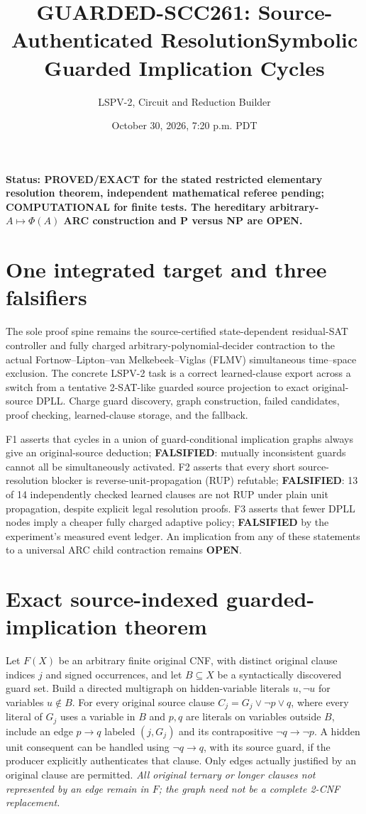 \documentclass[11pt]{article}
\title{GUARDED-SCC261: Source-Authenticated Resolution\Across Symbolic Guarded Implication Cycles}
\author{LSPV-2, Circuit and Reduction Builder}
\date{October 30, 2026, 7:20 p.m. PDT}
\begin{document}
\maketitle
\noindent\textbf{Status: PROVED/EXACT for the stated restricted elementary resolution theorem, independent mathematical referee pending; COMPUTATIONAL for finite tests. The hereditary arbitrary-$A\mapsto\Phi(A)$ ARC construction and P versus NP are OPEN.}
\section{One integrated target and three falsifiers}
The sole proof spine remains the source-certified state-dependent residual-SAT controller and fully charged arbitrary-polynomial-decider contraction to the actual Fortnow--Lipton--van Melkebeek--Viglas (FLMV) simultaneous time--space exclusion. The concrete LSPV-2 task is a correct learned-clause export across a switch from a tentative 2-SAT-like guarded source projection to exact original-source DPLL. Charge guard discovery, graph construction, failed candidates, proof checking, learned-clause storage, and the fallback.

F1 asserts that cycles in a union of guard-conditional implication graphs always give an original-source deduction; \textbf{FALSIFIED}: mutually inconsistent guards cannot all be simultaneously activated. F2 asserts that every short source-resolution blocker is reverse-unit-propagation (RUP) refutable; \textbf{FALSIFIED}: 13 of 14 independently checked learned clauses are not RUP under plain unit propagation, despite explicit legal resolution proofs. F3 asserts that fewer DPLL nodes imply a cheaper fully charged adaptive policy; \textbf{FALSIFIED} by the experiment's measured event ledger. An implication from any of these statements to a universal ARC child contraction remains \textbf{OPEN}.

\section{Exact source-indexed guarded-implication theorem}
Let $F(X)$ be an arbitrary finite original CNF, with distinct original clause indices $j$ and signed occurrences, and let $B\subseteq X$ be a syntactically discovered guard set. Build a directed multigraph on hidden-variable literals $u,\neg u$ for variables $u\notin B$. For every original source clause $C_j=G_j\vee\neg p\vee q$, where every literal of $G_j$ uses a variable in $B$ and $p,q$ are literals on variables outside $B$, include an edge $p\to q$ labeled $(j,G_j)$ and its contrapositive $\neg q\to\neg p$. A hidden unit consequent can be handled using $\neg q\to q$, with its source guard, if the producer explicitly authenticates that clause. Only edges actually justified by an original clause are permitted. \emph{All original ternary or longer clauses not represented by an edge remain in $F$; the graph need not be a complete 2-CNF replacement.}
\end{document}

